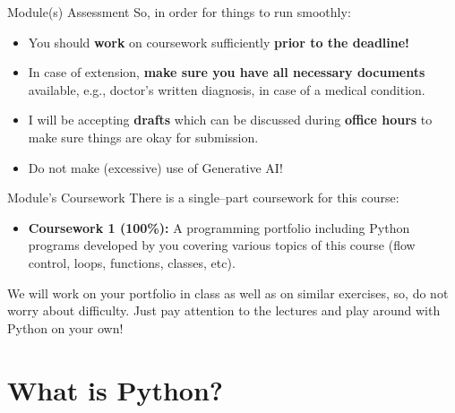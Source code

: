 \documentclass[aspectratio=169, 12pt, xcolor=table]{beamer}
\begin{document}
	\begin{headsup}{Module(s) Assessment}
		So, in order for things to run smoothly:
		\begin{itemize}
			\item You should \textbf{work} on coursework sufficiently \textbf{prior to the deadline!}
			\item In case of extension, \textbf{make sure you have all necessary documents} available, e.g., doctor's written diagnosis, in case of a medical condition.
			\item I will be accepting \textbf{drafts} which can be discussed during \textbf{office hours} to make sure things are okay for submission.
			\item Do not make (excessive) use of Generative AI!
		\end{itemize}
	\end{headsup}

	\begin{frame}{Module's Coursework}
		There is a single--part coursework for this course:
		\begin{itemize}
			\item \textbf{Coursework 1 (100\%):} A programming portfolio including Python programs developed by you covering various topics of this course (flow control, loops, functions, classes, etc).
		\end{itemize}
		
		We will work on your portfolio in class as well as on similar exercises, so, do not worry about difficulty. Just pay attention to the lectures and play around with Python on your own!
	\end{frame}

	\section{What is Python?}\label{sec:what-is-python}
	
	\sectionframe
	
\end{document}
